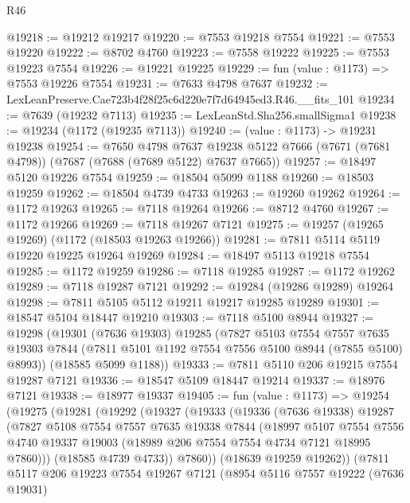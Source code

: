 \begin{lexlean}{R46}
\begin{coremodule}
@19218 := @19212 @19217
@19220 := @7553 @19218 @7554
@19221 := @7553 @19220
@19222 := @8702 @4760
@19223 := @7558 @19222
@19225 := @7553 @19223 @7554
@19226 := @19221 @19225
@19229 := fun (value : @1173) => @7553 @19226 @7554
@19231 := @7633 @4798 @7637
@19232 := LexLeanPreserve.Cae723b4f28f25c6d220e7f7d64945ed3.R46.__fits_101
@19234 := @7639 (@19232 @7113)
@19235 := LexLeanStd.Sha256.smallSigma1
@19238 := @19234 (@1172 (@19235 @7113))
@19240 := (value : @1173) -> @19231 @19238
@19254 := @7650
    @4798
    @7637
    @19238
    @5122
    @7666
    (@7671 (@7681 @4798))
    (@7687 (@7688 (@7689 @5122) @7637 @7665))
@19257 := @18497 @5120 @19226 @7554
@19259 := @18504 @5099 @1188
@19260 := @18503 @19259
@19262 := @18504 @4739 @4733
@19263 := @19260 @19262
@19264 := @1172 @19263
@19265 := @7118 @19264
@19266 := @8712 @4760
@19267 := @1172 @19266
@19269 := @7118 @19267 @7121
@19275 := @19257 (@19265 @19269) (@1172 (@18503 @19263 @19266))
@19281 := @7811 @5114 @5119 @19220 @19225 @19264 @19269
@19284 := @18497 @5113 @19218 @7554
@19285 := @1172 @19259
@19286 := @7118 @19285
@19287 := @1172 @19262
@19289 := @7118 @19287 @7121
@19292 := @19284 (@19286 @19289) @19264
@19298 := @7811 @5105 @5112 @19211 @19217 @19285 @19289
@19301 := @18547 @5104 @18447 @19210
@19303 := @7118 @5100 @8944
@19327 := @19298
    (@19301
      (@7636 @19303)
      @19285
      (@7827
        @5103
        @7554
        @7557
        @7635
        @19303
        @7844
        (@7811 @5101 @1192 @7554 @7556 @5100 @8944 (@7855 @5100) @8993))
      (@18585 @5099 @1188))
@19333 := @7811 @5110 @206 @19215 @7554 @19287 @7121
@19336 := @18547 @5109 @18447 @19214
@19337 := @18976 @7121
@19338 := @18977 @19337
@19405 := fun (value : @1173) =>
  @19254
    (@19275
      (@19281
        (@19292
          (@19327
            (@19333
              (@19336
                (@7636 @19338)
                @19287
                (@7827
                  @5108
                  @7554
                  @7557
                  @7635
                  @19338
                  @7844
                  (@18997
                    @5107
                    @7554
                    @7556
                    @4740
                    @19337
                    @19003
                    (@18989 @206 @7554 @7554 @4734 @7121 @18995 @7860)))
                (@18585 @4739 @4733))
              @7860))
          (@18639 @19259 @19262))
        (@7811
          @5117
          @206
          @19223
          @7554
          @19267
          @7121
          (@8954
            @5116
            @7557
            @19222
            (@7636 @19031)

\end{coremodule}
\end{lexlean}

